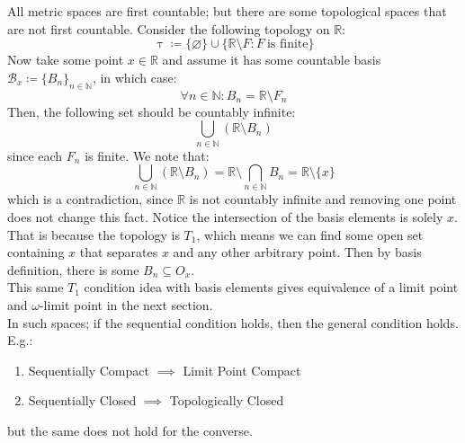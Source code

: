 \documentclass[10pt,letterpaper]{article} %
\begin{document}
All metric spaces are first countable; but there are some topological spaces that are not first countable. Consider the following topology on $\mathbb{R}$:
\begin{equation*}
\uptau \coloneq \{\varnothing\} \cup \{\mathbb{R} \setminus F: F \ \text{is finite}\}
\end{equation*}
Now take some point $x \in \mathbb{R}$ and assume it has some countable basis $\mathcal{B}_x \coloneq \{B_n\}_{n \in \mathbb{N}}$, in which case:
\begin{equation*}
\forall n \in \mathbb{N}: B_n = \mathbb{R}\setminus F_n
\end{equation*}
Then, the following set should be countably infinite:
\begin{equation*}
\bigcup_{n \in \mathbb{N}}(\mathbb{R}\setminus B_n)
\end{equation*}
since each $F_n$ is finite. We note that:
\begin{equation*}
\bigcup_{n \in \mathbb{N}}(\mathbb{R}\setminus B_n) = \mathbb{R} \setminus \bigcap_{n \in \mathbb{N}} B_n = \mathbb{R}\setminus \{x\}    
\end{equation*}
which is a contradiction, since $\mathbb{R}$ is not countably infinite and removing one point does not change this fact. Notice the intersection of the basis elements is solely $x$. That is because the topology is $T_1$, which means we can find some open set containing $x$ that separates $x$ and any other arbitrary point. Then by basis definition, there is some $B_n \subseteq O_x$.\\

This same $T_1$ condition idea with basis elements gives equivalence of a limit point and $\omega$-limit point in the next section.\\

In such spaces; if the sequential condition holds, then the general condition holds. E.g.:
\begin{enumerate}
\item Sequentially Compact $\implies$ Limit Point Compact
\item Sequentially Closed $\implies$ Topologically Closed
\end{enumerate}
but the same does not hold for the converse. 
\end{document}
